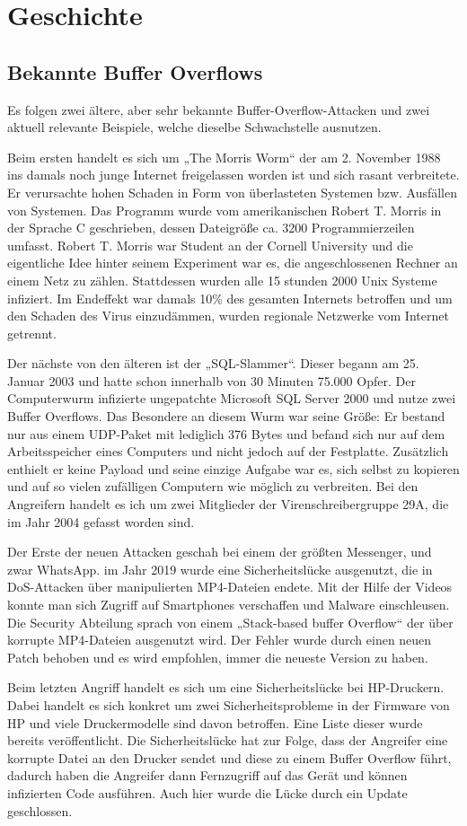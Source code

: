 \section{Geschichte}
\subsection{Bekannte Buffer Overflows}
Es folgen zwei ältere, aber sehr bekannte Buffer-Overflow-Attacken und zwei aktuell relevante Beispiele,
welche dieselbe Schwachstelle ausnutzen.

Beim ersten handelt es sich um „The Morris Worm“ der am 2. November 1988 ins damals noch junge Internet freigelassen
worden ist und sich rasant verbreitete. Er verursachte hohen Schaden in Form von überlasteten Systemen bzw. Ausfällen
von Systemen. Das Programm wurde vom amerikanischen Robert T. Morris in der Sprache C geschrieben, dessen Dateigröße
ca. 3200 Programmierzeilen umfasst. Robert T. Morris war Student an der Cornell University und die eigentliche
Idee hinter seinem Experiment war es, die angeschlossenen Rechner an einem Netz zu zählen. Stattdessen wurden alle
15 stunden 2000 Unix Systeme infiziert. Im Endeffekt war damals 10\% des gesamten Internets betroffen und um den
Schaden des Virus einzudämmen, wurden regionale Netzwerke vom Internet getrennt.

Der nächste von den älteren ist der „SQL-Slammer“. Dieser begann am 25. Januar 2003 und hatte schon innerhalb
von 30 Minuten 75.000 Opfer. Der Computerwurm infizierte ungepatchte Microsoft SQL Server 2000 und nutze zwei
Buffer Overflows. Das Besondere an diesem Wurm war seine Größe: Er bestand nur aus einem UDP-Paket mit lediglich
376 Bytes und befand sich nur auf dem Arbeitsspeicher eines Computers und nicht jedoch auf der Festplatte.
Zusätzlich enthielt er keine Payload und seine einzige Aufgabe war es, sich selbst zu kopieren und auf so
vielen zufälligen Computern wie möglich zu verbreiten. Bei den Angreifern handelt es ich um zwei Mitglieder
der Virenschreibergruppe 29A, die im Jahr 2004 gefasst worden sind.

Der Erste der neuen Attacken geschah bei einem der größten Messenger, und zwar WhatsApp. im Jahr
2019 wurde eine Sicherheitslücke ausgenutzt, die in DoS-Attacken über manipulierten MP4-Dateien endete.
Mit der Hilfe der Videos konnte man sich Zugriff auf Smartphones verschaffen und Malware einschleusen.
Die Security Abteilung sprach von einem „Stack-based buffer Overflow“ der über korrupte MP4-Dateien ausgenutzt wird.
Der Fehler wurde durch einen neuen Patch behoben und es wird empfohlen, immer die neueste Version zu haben.

Beim letzten Angriff handelt es sich um eine Sicherheitslücke bei HP-Druckern. Dabei handelt es sich konkret um zwei
Sicherheitsprobleme in der Firmware von HP und viele Druckermodelle sind davon betroffen. Eine Liste dieser wurde
bereits veröffentlicht. Die Sicherheitslücke hat zur Folge, dass der Angreifer eine korrupte Datei an den Drucker
sendet und diese zu einem Buffer Overflow führt, dadurch haben die Angreifer dann Fernzugriff auf das Gerät und können
infizierten Code ausführen. Auch hier wurde die Lücke durch ein Update geschlossen.



